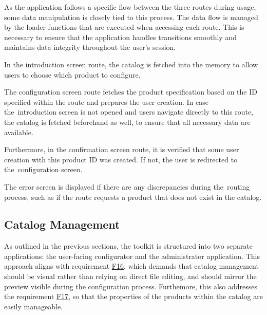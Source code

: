 As the application follows a specific flow between the three routes during usage, some data manipulation is closely tied to this process. The data flow is managed by the loader functions that are executed when accessing each route. This is necessary to ensure that the application handles transitions smoothly and maintains data integrity throughout the user's session.

In the introduction screen route, the catalog is fetched into the memory to allow users to choose which product to configure.

The configuration screen route fetches the product specification based on the ID specified within the route and prepares the user creation. In case the~introduction screen is not opened and users navigate directly to this route, the catalog is fetched beforehand as well, to ensure that all necessary data are available.

Furthermore, in the confirmation screen route, it is verified that some user creation with this product ID was created. If not, the user is redirected to the~configuration screen. 

The error screen is displayed if there are any discrepancies during the~routing process, such as if the route requests a product that does not exist in the catalog.


\subsection{Catalog Management} \label{section:catalog-management}

As outlined in the previous sections, the toolkit is structured into two separate applications: the user-facing configurator and the administrator application. This approach aligns with requirement \hyperref[itm:F16]{F16}, which demands that catalog management should be visual rather than relying on direct file editing, and should mirror the preview visible during the configuration process. Furthemore, this also addresses the requirement \hyperref[itm:F17]{F17}, so that the properties of the products within the catalog are easily manageable.

